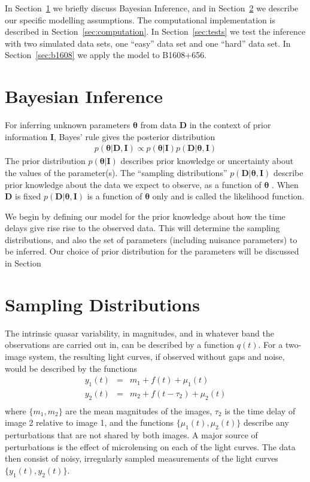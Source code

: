 \documentclass[useAMS,usenatbib, a4paper]{mn2e} \usepackage{natbib}
\newcommand{\params}{\boldsymbol{\theta}}
\newcommand{\data}{\boldsymbol{D}}
\newcommand{\info}{\boldsymbol{I}}
\begin{document}
In Section~\ref{sec:bayes} we briefly discuss Bayesian Inference, and in
Section~\ref{sec:sampling} we describe our specific
modelling assumptions. The computational implementation is described in
Section~\ref{sec:computation}. In Section~\ref{sec:tests} we test the inference
with two simulated data sets, one ``easy'' data set and one ``hard'' data set.
In Section~\ref{sec:b1608} we apply the model to B1608+656.


\section{Bayesian Inference}\label{sec:bayes}
For inferring unknown parameters $\params$ from data $\data$ in the context
of prior information $\info$,
Bayes' rule gives the posterior distribution
\begin{eqnarray}
p(\params | \data, \info) \propto p(\params|\info)p(\data|\params, \info)
\end{eqnarray}
The prior distribution $p(\params|\info)$ describes prior knowledge or uncertainty
about the values of the parameter(s). The ``sampling distributions''
$p(\data|\params,\info)$
describe prior knowledge about the data we expect to observe, as a function of
$\params$ \citep{caticha}. When $\data$ is fixed $p(\data|\params,\info)$ is a function of
$\params$ only and is called the likelihood function.

We begin by defining our model for the prior knowledge about how the time
delays give rise rise to the observed data. This will determine the sampling
distributions, and also the set of parameters (including nuisance parameters) to
be inferred. Our choice of prior distribution for the parameters will be
discussed in Section

\section{Sampling Distributions}\label{sec:sampling}
The intrinsic quasar variability, in magnitudes, and in whatever band the
observations are carried out in, can be described by a function $q(t)$. For a
two-image system, the resulting light curves, if observed without gaps and
noise, would be described by the functions
\begin{eqnarray}
y_1(t) &=& m_1 + f(t) + \mu_1(t) \\
y_2(t) &=& m_2 + f(t - \tau_2) + \mu_2(t) \\
\end{eqnarray}
where $\{m_1, m_2\}$ are the mean magnitudes of the images,
$\tau_2$ is the time delay of image 2 relative to image 1, and the
functions $\{\mu_1(t), \mu_2(t)\}$ describe any perturbations that are not
shared by both images. A major source of perturbations is the effect of
microlensing on each of the light curves. The data then consist of
noisy, irregularly sampled measurements of the light curves
$\{y_1(t), y_2(t)\}$.
\end{document}

